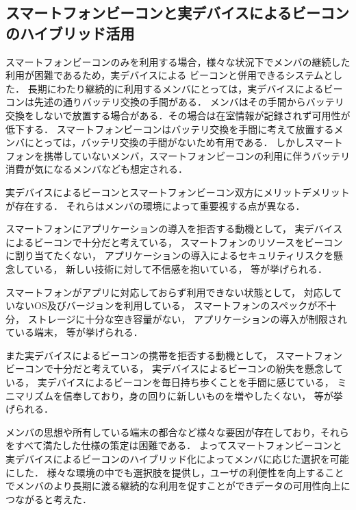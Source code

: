 \subsection{スマートフォンビーコンと実デバイスによるビーコンのハイブリッド活用}
スマートフォンビーコンのみを利用する場合，様々な状況下でメンバの継続した利用が困難であるため，実デバイスによる
ビーコンと併用できるシステムとした．
長期にわたり継続的に利用するメンバにとっては，実デバイスによるビーコンは先述の通りバッテリ交換の手間がある．
メンバはその手間からバッテリ交換をしないで放置する場合がある．その場合は在室情報が記録されず可用性が低下する．
スマートフォンビーコンはバッテリ交換を手間に考えて放置するメンバにとっては，バッテリ交換の手間がないため有用である．
しかしスマートフォンを携帯していないメンバ，スマートフォンビーコンの利用に伴うバッテリ消費が気になるメンバなども想定される．

実デバイスによるビーコンとスマートフォンビーコン双方にメリットデメリットが存在する．
それらはメンバの環境によって重要視する点が異なる．

スマートフォンにアプリケーションの導入を拒否する動機として，
実デバイスによるビーコンで十分だと考えている，
スマートフォンのリソースをビーコンに割り当てたくない，
アプリケーションの導入によるセキュリティリスクを懸念している，
新しい技術に対して不信感を抱いている，
等が挙げられる．

スマートフォンがアプリに対応しておらず利用できない状態として，
対応していないOS及びバージョンを利用している，
スマートフォンのスペックが不十分，
ストレージに十分な空き容量がない，
アプリケーションの導入が制限されている端末，
等が挙げられる．

また実デバイスによるビーコンの携帯を拒否する動機として，
スマートフォンビーコンで十分だと考えている，
実デバイスによるビーコンの紛失を懸念している，
実デバイスによるビーコンを毎日持ち歩くことを手間に感じている，
ミニマリズムを信奉しており，身の回りに新しいものを増やしたくない，
等が挙げられる．


メンバの思想や所有している端末の都合など様々な要因が存在しており，それらをすべて満たした仕様の策定は困難である．
よってスマートフォンビーコンと実デバイスによるビーコンのハイブリッド化によってメンバに応じた選択を可能にした．
様々な環境の中でも選択肢を提供し，ユーザの利便性を向上することでメンバのより長期に渡る継続的な利用を促すことができデータの可用性向上につながると考えた．

